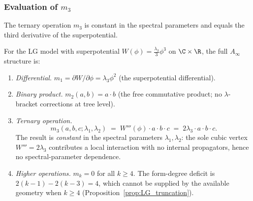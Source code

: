 \subsubsection{Evaluation of $m_3$}

The ternary operation $m_3$ is constant in the spectral parameters and equals the third derivative of the superpotential.

\begin{computation}
\label{comp:lg-m3-explicit}
For the LG model with superpotential $W(\phi) = \frac{\lambda_3}{3}\phi^3$ on
$\C \times \R$, the full $A_\infty$ structure is:
\begin{enumerate}[label=(\roman*)]
\item \emph{Differential.}
 $m_1 = \partial W / \partial \phi = \lambda_3 \phi^2$ (the superpotential
 differential).

\item \emph{Binary product.}
 $m_2(a,b) = a \cdot b$ (the free commutative product; no $\lambda$-bracket
 corrections at tree level).

\item \emph{Ternary operation.}
 \begin{equation}\label{eq:lg-m3-evaluated}
 m_3(a,b,c;\lambda_1,\lambda_2) \;=\; W'''(\phi) \cdot a \cdot b \cdot c
 \;=\; 2\lambda_3 \cdot a \cdot b \cdot c.
 \end{equation}
 The result is \emph{constant} in the spectral parameters $\lambda_1,\lambda_2$:
 the sole cubic vertex $W'''=2\lambda_3$ contributes a local interaction with no
 internal propagators, hence no spectral-parameter dependence.

\item \emph{Higher operations.}
 $m_k = 0$ for all $k \ge 4$. The form-degree deficit is
 $2(k-1) - 2(k-3) = 4$, which cannot be supplied by the available geometry
 when $k \ge 4$ (Proposition~\ref{prop:LG_truncation}).
\end{enumerate}
\end{computation}

